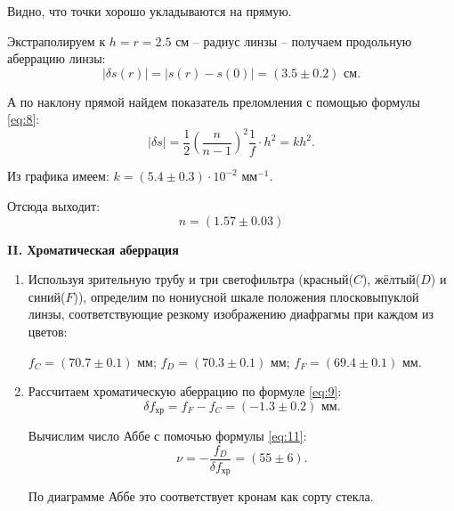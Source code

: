 \documentclass[12pt,a4paper]{article}
\begin{document}
\begin{enumerate}
		Видно, что точки хорошо укладываются на прямую.
		
		Экстраполируем к $h = r = 2.5$ см -- радиус линзы -- получаем продольную аберрацию линзы:
		\begin{equation*}
			|\delta s(r)| = |s(r) - s(0)| = (3.5 \pm 0.2)\text{ см}.
		\end{equation*}
	
		А по наклону прямой найдем показатель преломления с помощью формулы \ref{eq:8}:
		\begin{equation*}
			|\delta s| = \frac{1}{2}\left(\frac{n}{n - 1}\right)^2\frac{1}{f} \cdot h^2 = kh^2.
		\end{equation*}
		
		Из графика имеем: $k = (5.4 \pm 0.3)\cdot 10^{-2} \text{ мм}^{-1}$.
		
		Отсюда выходит: 
		\begin{equation*}
			\boxed{n = (1.57 \pm 0.03)}
		\end{equation*}

		
	\end{enumerate}

	\begin{center}
		\textbf{II. Хроматическая аберрация}
	\end{center}

	\begin{enumerate}
		\item Используя зрительную трубу и три светофильтра (красный($C$), жёлтый($D$) и синий($F$)), определим по нониусной шкале положения плосковыпуклой линзы, соответствующие резкому изображению диафрагмы при каждом из цветов:
		
		$f_C = (70.7 \pm 0.1)$ мм; $f_D = (70.3 \pm 0.1)$ мм; $f_F = (69.4 \pm 0.1)$ мм.
	
		\item Рассчитаем хроматическую аберрацию по формуле \ref{eq:9}:
		\begin{equation*}
			\delta f_{\text{хр}} = f_F - f_C = (-1.3 \pm 0.2) \text{ мм}.
		\end{equation*}
	
		Вычислим число Аббе с помочью формулы \ref{eq:11}:
		\begin{equation*}
			\nu = -\frac{f_D}{\delta f_{\text{хр}}} = (55 \pm 6).
		\end{equation*}
	
		По диаграмме Аббе это соответствует кронам как сорту стекла.
	\end{enumerate}
	
\end{document}
